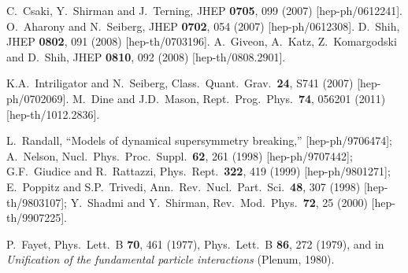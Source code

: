 \documentclass[11pt]{article}
\begin{document}
\begin{thebibliography}{999}
%
  C.~Csaki, Y.~Shirman and J.~Terning,
  JHEP {\bf 0705}, 099 (2007)
  [hep-ph/0612241].
%
  O.~Aharony and N.~Seiberg,
  JHEP {\bf 0702}, 054 (2007)
  [hep-ph/0612308].
%
  D.~Shih,
  JHEP {\bf 0802}, 091 (2008)
  [hep-th/0703196].
%
  A.~Giveon, A.~Katz, Z.~Komargodski and D.~Shih, 
  JHEP {\bf 0810}, 092 (2008)   
  [hep-th/0808.2901].

K.A.~Intriligator and N.~Seiberg,
  Class.\ Quant.\ Grav.\  {\bf 24}, S741 (2007)
  [hep-ph/0702069].
M.~Dine and J.D.~Mason,
  Rept.\ Prog.\ Phys.\  {\bf 74}, 056201 (2011)
  [hep-th/1012.2836].

L.~Randall, 
  ``Models of dynamical supersymmetry breaking,''
  [hep-ph/9706474];
A.~Nelson, 
  Nucl.\ Phys.\ Proc.\ Suppl.\  {\bf 62}, 261 (1998)
  [hep-ph/9707442];
G.F.~Giudice and R.~Rattazzi,
  Phys.\ Rept.\  {\bf 322}, 419 (1999)
  [hep-ph/9801271];
E.~Poppitz and S.P.~Trivedi,
  Ann.\ Rev.\ Nucl.\ Part.\ Sci.\  {\bf 48}, 307 (1998)
  [hep-th/9803107];
Y.~Shadmi and Y.~Shirman,
  Rev.\ Mod.\ Phys.\  {\bf 72}, 25 (2000)
  [hep-th/9907225].

P.~Fayet, 
  Phys.\ Lett.\ B {\bf 70}, 461 (1977),
  Phys.\ Lett.\ B {\bf 86}, 272 (1979),
  and in {\em Unification of the fundamental
  particle interactions} (Plenum, 1980).


\end{thebibliography}
\end{document}
